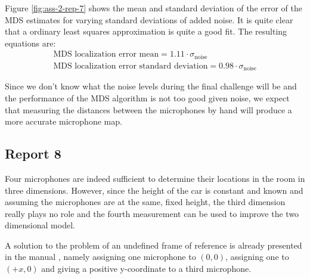 \documentclass[11pt,titlepage]{report}
\begin{document}
Figure \ref{fig:ass-2-rep-7} shows the mean and standard deviation of the error of the MDS estimates for varying standard deviations of added noise. It is quite clear that a ordinary least squares approximation is quite a good fit. The resulting equations are:
\begin{align*}
\text{MDS localization error mean} = 1.11\cdot\sigma_{\text{noise}} \\
\text{MDS localization error standard deviation} = 0.98\cdot\sigma_{\text{noise}}
\end{align*}

Since we don't know what the noise levels during the final challenge will be and the performance of the MDS algorithm is not too good given noise, we expect that measuring the distances between the microphones by hand will produce a more accurate microphone map.
\subsection{Report 8}
Four microphones are indeed sufficient to determine their locations in the room in three dimensions. However, since the height of the car is constant and known and assuming the microphones are at the same, fixed height, the third dimension really plays no role and the fourth measurement can be used to improve the two dimensional model.

A solution to the problem of an undefined frame of reference is already presented in the manual \cite{epo4-manual}, namely assigning one microphone to $(0,0)$, assigning one to $(+x,0)$ and giving a positive y-coordinate to a third microphone.
\end{document}
